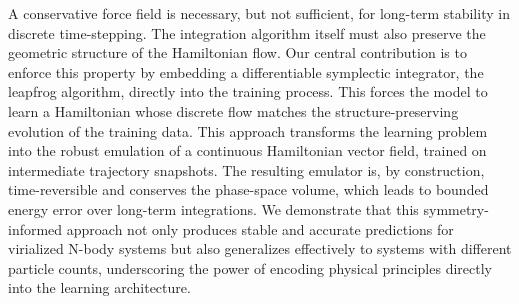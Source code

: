 \documentclass[]{article}
\begin{document}
A conservative force field is necessary, but not sufficient, for long-term stability in discrete time-stepping. The integration algorithm itself must also preserve the geometric structure of the Hamiltonian flow. Our central contribution is to enforce this property by embedding a differentiable symplectic integrator, the leapfrog algorithm, directly into the training process. This forces the model to learn a Hamiltonian whose discrete flow matches the structure-preserving evolution of the training data. This approach transforms the learning problem into the robust emulation of a continuous Hamiltonian vector field, trained on intermediate trajectory snapshots. The resulting emulator is, by construction, time-reversible and conserves the phase-space volume, which leads to bounded energy error over long-term integrations. We demonstrate that this symmetry-informed approach not only produces stable and accurate predictions for virialized N-body systems but also generalizes effectively to systems with different particle counts, underscoring the power of encoding physical principles directly into the learning architecture.
\end{document}
